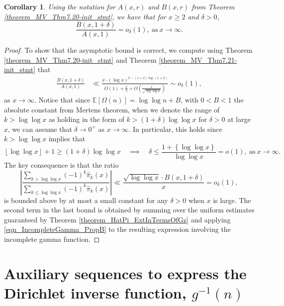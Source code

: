 \documentclass[11pt,reqno,a4letter]{article}
\numberwithin{figure}{section}
\numberwithin{table}{section}
\newcommand{\floor}[1]{\left\lfloor #1 \right\rfloor}
\theoremstyle{plain}
\newtheorem{cor}[theorem]{Corollary}
\numberwithin{theorem}{section}
\theoremstyle{definition}
\begin{document}
\begin{cor} 
\label{theorem_MV_Thm7.20} 
Using the notation for $A(x, r)$ and $B(x, r)$ from 
Theorem \ref{theorem_MV_Thm7.20-init_stmt}, 
we have that for $x \geq 2$ and $\delta > 0$, 
\[
\frac{B(x, 1+\delta)}{A(x, 1)} = o_{\delta}(1), 
     \mathrm{\ as\ } x \rightarrow \infty. 
\]
\end{cor} 
\begin{proof} 
To show that the asymptotic bound is correct, we compute using 
Theorem \ref{theorem_MV_Thm7.20-init_stmt} and 
Theorem \ref{theorem_MV_Thm7.21-init_stmt} that 
\begin{align*} 
\frac{B(x, 1+\delta)}{A(x, 1)} & \ll 
     \frac{x \cdot (\log x)^{\delta - (1+\delta)\log(1+\delta)}}{ 
     O(1) + \frac{x}{2} + 
     O\left(\frac{x}{\sqrt{\log\log x}}\right)} 
     \sim 
     o_{\delta}(1),  
\end{align*} 
as $x \rightarrow \infty$. Notice that since $\mathbb{E}[\Omega(n)] = \log\log n + B$, with $0 < B < 1$ the 
absolute constant from Mertens theorem, 
when we denote the range of $k > \log\log x$ as holding in the form of 
$k > (1 + \delta) \log\log x$ for $\delta > 0$ at large $x$, we can assume that 
$\delta \rightarrow 0^{+}$ as $x \rightarrow \infty$. 
In particular, this holds since $k > \log\log x$ implies that 
\[
\floor{\log\log x} + 1 \geq (1 + \delta) \log\log x \quad\implies\quad 
     \delta \leq \frac{1 + \left\{\log\log x\right\}}{\log\log x} = o(1), 
     \mathrm{\ as\ } x \rightarrow \infty. 
\] 
The key consequence is that the ratio 
\[
\left\lvert \frac{\sum\limits_{k > \log\log x} (-1)^k \widehat{\pi}_k(x)}{ 
     \sum\limits_{k \leq \log\log x} (-1)^k \widehat{\pi}_k(x)} \right\rvert 
     \ll 
     \frac{\sqrt{\log\log x} \cdot B(x, 1+\delta)}{x} = o_{\delta}(1), 
\] 
is bounded above by at most a small constant for any $\delta > 0$ when $x$ is large. 
The second term in the last bound is obtained by summing over the uniform estimates 
guaranteed by Theorem \ref{theorem_HatPi_ExtInTermsOfGz} and 
applying \eqref{eqn_IncompleteGamma_PropB} to the 
resulting expression involving the incomplete gamma function. 
\end{proof} 

\newpage
\section{Auxiliary sequences to express the Dirichlet inverse function, $g^{-1}(n)$} 
\label{Section_InvFunc_PreciseExpsAndAsymptotics} 
\end{document}
